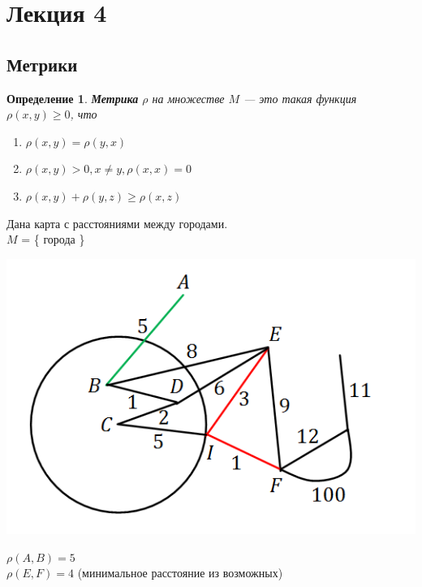 \documentclass[12pt]{article}
\newtheorem*{definition}{Определение}
\begin{document}
	\newpage
	\section{Лекция 4}
	\subsection{Метрики}
	\begin{definition}
		\textbf{Метрика} $\rho$ на множестве $M$ --- это такая функция $\rho (x, y) \geqslant 0$, что 
		\begin{enumerate}
			\item $\rho (x, y) = \rho (y, x)$
			\item $\rho (x, y) > 0, x\neq y, \rho (x, x) = 0$ 
			\item $\rho (x, y) + \rho (y, z) \geqslant \rho (x, z)$
		\end{enumerate}
	\end{definition}
	Дана карта с расстояниями между городами.\\
	$M$ = \{ города \}\begin{center}
		\includegraphics[scale=0.7]{l4_1.png}\end{center}
	$\rho (A, B) = 5$\\
	$\rho (E, F) = 4$ (минимальное расстояние из возможных)\\
	\\
\end{document}
